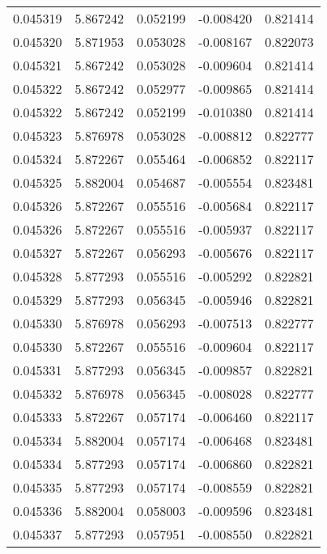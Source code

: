\begin{tabular}{lrrrr}
0.045319    &  5.867242 &  0.052199 & -0.008420 &             0.821414 \\
0.045320    &  5.871953 &  0.053028 & -0.008167 &             0.822073 \\
0.045321    &  5.867242 &  0.053028 & -0.009604 &             0.821414 \\
0.045322    &  5.867242 &  0.052977 & -0.009865 &             0.821414 \\
0.045322    &  5.867242 &  0.052199 & -0.010380 &             0.821414 \\
0.045323    &  5.876978 &  0.053028 & -0.008812 &             0.822777 \\
0.045324    &  5.872267 &  0.055464 & -0.006852 &             0.822117 \\
0.045325    &  5.882004 &  0.054687 & -0.005554 &             0.823481 \\
0.045326    &  5.872267 &  0.055516 & -0.005684 &             0.822117 \\
0.045326    &  5.872267 &  0.055516 & -0.005937 &             0.822117 \\
0.045327    &  5.872267 &  0.056293 & -0.005676 &             0.822117 \\
0.045328    &  5.877293 &  0.055516 & -0.005292 &             0.822821 \\
0.045329    &  5.877293 &  0.056345 & -0.005946 &             0.822821 \\
0.045330    &  5.876978 &  0.056293 & -0.007513 &             0.822777 \\
0.045330    &  5.872267 &  0.055516 & -0.009604 &             0.822117 \\
0.045331    &  5.877293 &  0.056345 & -0.009857 &             0.822821 \\
0.045332    &  5.876978 &  0.056345 & -0.008028 &             0.822777 \\
0.045333    &  5.872267 &  0.057174 & -0.006460 &             0.822117 \\
0.045334    &  5.882004 &  0.057174 & -0.006468 &             0.823481 \\
0.045334    &  5.877293 &  0.057174 & -0.006860 &             0.822821 \\
0.045335    &  5.877293 &  0.057174 & -0.008559 &             0.822821 \\
0.045336    &  5.882004 &  0.058003 & -0.009596 &             0.823481 \\
0.045337    &  5.877293 &  0.057951 & -0.008550 &             0.822821 \\

\end{tabular}
